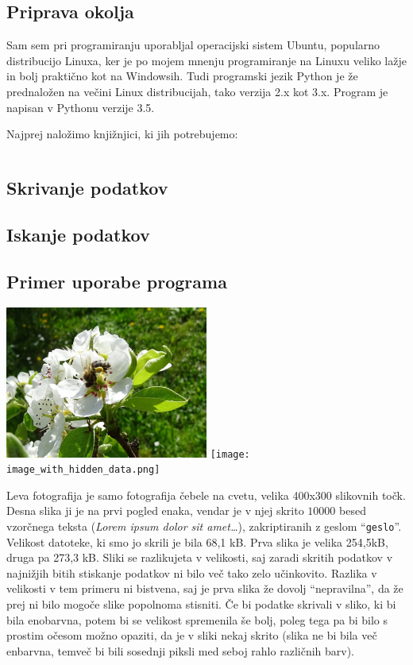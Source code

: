 \subsection{Priprava okolja}
    Sam sem pri programiranju uporabljal operacijski sistem Ubuntu, popularno distribucijo Linuxa, ker je po mojem mnenju programiranje na Linuxu veliko lažje in bolj praktično kot na Windowsih. Tudi programski jezik Python je že prednaložen na večini Linux distribucijah, tako verzija 2.x kot 3.x. Program je napisan v Pythonu verzije 3.5.

    Najprej naložimo knjižnjici, ki jih potrebujemo:

    \inputminted[firstline=1, lastline=2, frame=lines]{bash}{latex/bashscripts.sh}


\subsection{Skrivanje podatkov}

\subsection{Iskanje podatkov}

\subsection{Primer uporabe programa}
    \includegraphics[width=0.5\textwidth]{image.png}
    \texttt{[image: image\_with\_hidden\_data.png]}

    Leva fotografija je samo fotografija čebele na cvetu, velika 400x300 slikovnih točk. Desna slika ji je na prvi pogled enaka, vendar je v njej skrito $10 000$ besed vzorčnega teksta (\textit{Lorem ipsum dolor sit amet\ldots}), zakriptiranih z geslom ``\texttt{geslo}''. Velikost datoteke, ki smo jo skrili je bila 68,1 kB. Prva slika je velika 254,5kB, druga pa 273,3 kB. Sliki se razlikujeta v velikosti, saj zaradi skritih podatkov v najnižjih bitih stiskanje podatkov ni bilo več tako zelo učinkovito. Razlika v velikosti v tem primeru ni bistvena, saj je prva slika že dovolj ``nepravilna'', da že prej ni bilo mogoče slike popolnoma stisniti. Če bi podatke skrivali v sliko, ki bi bila enobarvna, potem bi se velikost spremenila še bolj, poleg tega pa bi bilo s prostim očesom možno opaziti, da je v sliki nekaj skrito (slika ne bi bila več enbarvna, temveč bi bili sosednji piksli med seboj rahlo različnih barv).


